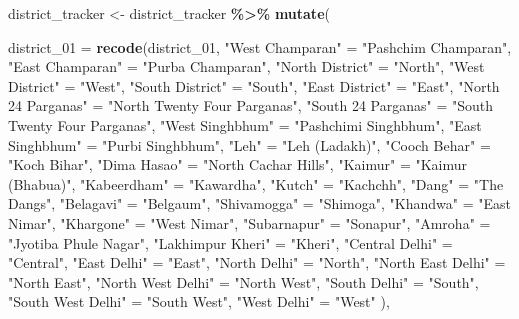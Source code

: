 \documentclass[
]{article}
\newenvironment{Shaded}{\begin{snugshade}}{\end{snugshade}}
\newcommand{\AttributeTok}[1]{\textcolor[rgb]{0.13,0.29,0.53}{#1}}
\newcommand{\FunctionTok}[1]{\textcolor[rgb]{0.13,0.29,0.53}{\textbf{#1}}}
\newcommand{\NormalTok}[1]{#1}
\newcommand{\OtherTok}[1]{\textcolor[rgb]{0.56,0.35,0.01}{#1}}
\newcommand{\SpecialCharTok}[1]{\textcolor[rgb]{0.81,0.36,0.00}{\textbf{#1}}}
\newcommand{\StringTok}[1]{\textcolor[rgb]{0.31,0.60,0.02}{#1}}
\begin{document}
\begin{Shaded}
\begin{Highlighting}[]
\NormalTok{district\_tracker }\OtherTok{\textless{}{-}}\NormalTok{ district\_tracker }\SpecialCharTok{\%\textgreater{}\%}
  \FunctionTok{mutate}\NormalTok{(}
    
    \AttributeTok{district\_01 =} \FunctionTok{recode}\NormalTok{(district\_01,}
      \StringTok{"West Champaran"} \OtherTok{=} \StringTok{"Pashchim Champaran"}\NormalTok{,}
      \StringTok{"East Champaran"} \OtherTok{=} \StringTok{"Purba Champaran"}\NormalTok{,}
      \StringTok{"North District"} \OtherTok{=} \StringTok{"North"}\NormalTok{,}
      \StringTok{"West District"} \OtherTok{=} \StringTok{"West"}\NormalTok{,}
      \StringTok{"South District"} \OtherTok{=} \StringTok{"South"}\NormalTok{,}
      \StringTok{"East District"} \OtherTok{=} \StringTok{"East"}\NormalTok{,}
      \StringTok{"North 24 Parganas"} \OtherTok{=} \StringTok{"North Twenty Four Parganas"}\NormalTok{,}
      \StringTok{"South 24 Parganas"} \OtherTok{=} \StringTok{"South Twenty Four Parganas"}\NormalTok{,}
      \StringTok{"West Singhbhum"} \OtherTok{=} \StringTok{"Pashchimi Singhbhum"}\NormalTok{,}
      \StringTok{"East Singhbhum"} \OtherTok{=} \StringTok{"Purbi Singhbhum"}\NormalTok{,}
      \StringTok{"Leh"} \OtherTok{=} \StringTok{"Leh (Ladakh)"}\NormalTok{,}
      \StringTok{"Cooch Behar"} \OtherTok{=} \StringTok{"Koch Bihar"}\NormalTok{,}
      \StringTok{"Dima Hasao"} \OtherTok{=} \StringTok{"North Cachar Hills"}\NormalTok{,}
      \StringTok{"Kaimur"} \OtherTok{=} \StringTok{"Kaimur (Bhabua)"}\NormalTok{,}
      \StringTok{"Kabeerdham"} \OtherTok{=} \StringTok{"Kawardha"}\NormalTok{,}
      \StringTok{"Kutch"} \OtherTok{=} \StringTok{"Kachchh"}\NormalTok{,}
      \StringTok{"Dang"} \OtherTok{=} \StringTok{"The Dangs"}\NormalTok{,}
      \StringTok{"Belagavi"} \OtherTok{=} \StringTok{"Belgaum"}\NormalTok{,}
      \StringTok{"Shivamogga"} \OtherTok{=} \StringTok{"Shimoga"}\NormalTok{,}
      \StringTok{"Khandwa"} \OtherTok{=} \StringTok{"East Nimar"}\NormalTok{,}
      \StringTok{"Khargone"} \OtherTok{=} \StringTok{"West Nimar"}\NormalTok{,}
      \StringTok{"Subarnapur"} \OtherTok{=} \StringTok{"Sonapur"}\NormalTok{,}
      \StringTok{"Amroha"} \OtherTok{=} \StringTok{"Jyotiba Phule Nagar"}\NormalTok{,}
      \StringTok{"Lakhimpur Kheri"} \OtherTok{=} \StringTok{"Kheri"}\NormalTok{,}
      \StringTok{"Central Delhi"} \OtherTok{=} \StringTok{"Central"}\NormalTok{,}
      \StringTok{"East Delhi"} \OtherTok{=} \StringTok{"East"}\NormalTok{,}
      \StringTok{"North Delhi"} \OtherTok{=} \StringTok{"North"}\NormalTok{,}
      \StringTok{"North East Delhi"} \OtherTok{=} \StringTok{"North East"}\NormalTok{,}
      \StringTok{"North West Delhi"} \OtherTok{=} \StringTok{"North West"}\NormalTok{,}
      \StringTok{"South Delhi"} \OtherTok{=} \StringTok{"South"}\NormalTok{,}
      \StringTok{"South West Delhi"} \OtherTok{=} \StringTok{"South West"}\NormalTok{,}
      \StringTok{"West Delhi"} \OtherTok{=} \StringTok{"West"}
\NormalTok{    ),}
    

\end{Highlighting}
\end{Shaded}
\end{document}
